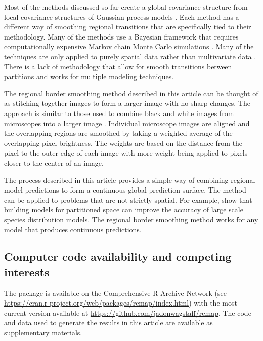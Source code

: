 Most of the methods discussed so far create a global covariance structure from local covariance structures of Gaussian process models \citep{fuentes_high_2001, fuentes_new_2001, kim_analyzing_2005, konomi_adaptive_2014, heaton_nonstationary_2017}. Each method has a different way of smoothing regional transitions that are specifically tied to their methodology. Many of the methods use a Bayesian framework that requires computationally expensive Markov chain Monte Carlo simulations \citep{kim_analyzing_2005, konomi_adaptive_2014, heaton_nonstationary_2017, gosoniu_bayesian_2006, gosoniu_mapping_2009}. Many of the techniques are only applied to purely spatial data rather than multivariate data \citep{kim_analyzing_2005, konomi_adaptive_2014, heaton_nonstationary_2017}. There is a lack of methodology that allow for smooth transitions between partitions and works for multiple modeling techniques.

The regional border smoothing method described in this article can be thought of as stitching together images to form a larger image with no sharp changes. The approach is similar to those used to combine black and white images from microscopes into a larger image \citep{thevenaz_user-friendly_2007}. Individual microscope images are aligned and the overlapping regions are smoothed by taking a weighted average of the overlapping pixel brightness. The weights are based on the distance from the pixel to the outer edge of each image with more weight being applied to pixels closer to the center of an image.

The process described in this article provides a simple way of combining regional model predictions to form a continuous global prediction surface. The method can be applied to problems that are not strictly spatial. For example, \citet{osborne_should_2002} show that building models for partitioned space can improve the accuracy of large scale species distribution models. The regional border smoothing method works for any model that produces continuous predictions. 

\subsection{Computer code availability and competing interests}

The  package is available on the Comprehensive R Archive Network (see \url{https://cran.r-project.org/web/packages/remap/index.html}) with the most current version available at \url{https://github.com/jadonwagstaff/remap}. The code and data used to generate the results in this article are available as supplementary materials.

